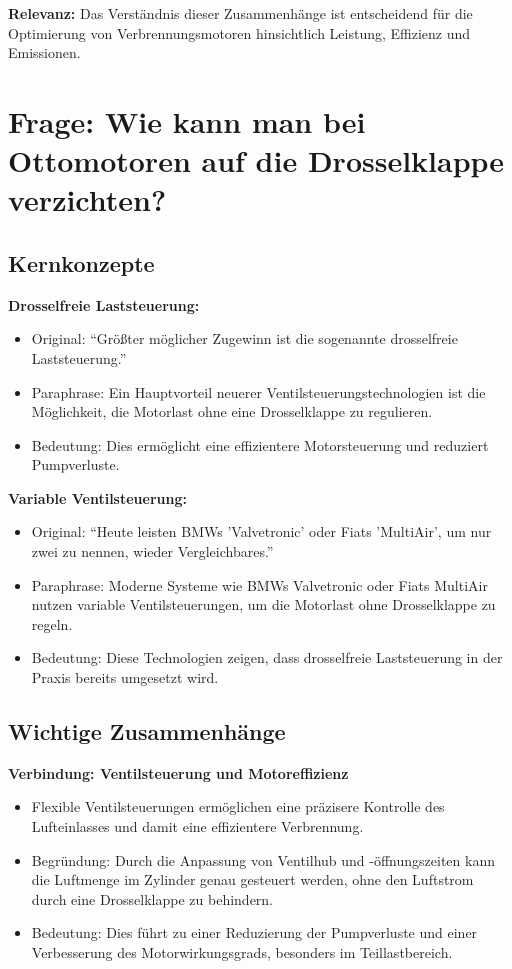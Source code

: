\documentclass[a4paper,12pt]{article}
\begin{document}
\textbf{Relevanz:} Das Verständnis dieser Zusammenhänge ist entscheidend für die Optimierung von Verbrennungsmotoren hinsichtlich Leistung, Effizienz und Emissionen.


\section{Frage: Wie kann man bei Ottomotoren auf die Drosselklappe verzichten?}

\subsection{Kernkonzepte}

\textbf{Drosselfreie Laststeuerung:}

\begin{itemize}
    \item Original: \enquote{Größter möglicher Zugewinn ist die sogenannte drosselfreie Laststeuerung.}
    \item Paraphrase: Ein Hauptvorteil neuerer Ventilsteuerungstechnologien ist die Möglichkeit, die Motorlast ohne eine Drosselklappe zu regulieren.
    \item Bedeutung: Dies ermöglicht eine effizientere Motorsteuerung und reduziert Pumpverluste.
\end{itemize}

\textbf{Variable Ventilsteuerung:}

\begin{itemize}
    \item Original: \enquote{Heute leisten BMWs 'Valvetronic' oder Fiats 'MultiAir', um nur zwei zu nennen, wieder Vergleichbares.}
    \item Paraphrase: Moderne Systeme wie BMWs Valvetronic oder Fiats MultiAir nutzen variable Ventilsteuerungen, um die Motorlast ohne Drosselklappe zu regeln.
    \item Bedeutung: Diese Technologien zeigen, dass drosselfreie Laststeuerung in der Praxis bereits umgesetzt wird.
\end{itemize}

\subsection{Wichtige Zusammenhänge}

\textbf{Verbindung: Ventilsteuerung und Motoreffizienz}

\begin{itemize}
    \item Flexible Ventilsteuerungen ermöglichen eine präzisere Kontrolle des Lufteinlasses und damit eine effizientere Verbrennung.
    \item Begründung: Durch die Anpassung von Ventilhub und -öffnungszeiten kann die Luftmenge im Zylinder genau gesteuert werden, ohne den Luftstrom durch eine Drosselklappe zu behindern.
    \item Bedeutung: Dies führt zu einer Reduzierung der Pumpverluste und einer Verbesserung des Motorwirkungsgrads, besonders im Teillastbereich.
\end{itemize}
\end{document}

